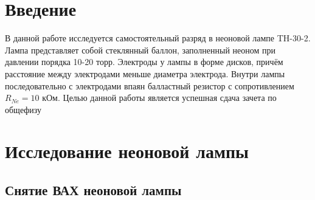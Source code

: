 





\tableofcontents
\newpage

\section*{Введение}
\label{sec:input}
В данной работе исследуется самостоятельный разряд в неоновой лампе TH-30-2. Лампа представляет собой стеклянный баллон, заполненный неоном при давлении порядка 10-20 торр. Электроды у лампы в форме дисков, причём расстояние между электродами меньше диаметра электрода. Внутри лампы последовательно с электродами впаян балластный резистор с сопротивлением $R_{Ne}=10$ кОм.  
Целью данной работы является успешная сдача зачета по общефизу

\newpage
\section{Исследование неоновой лампы}
\subsection{Снятие ВАХ неоновой лампы}

